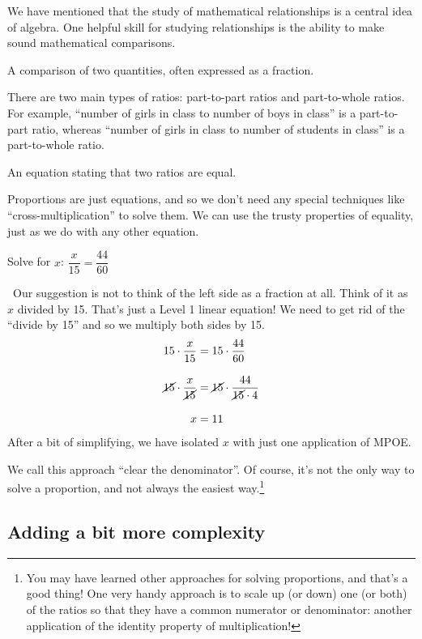 We have mentioned that the study of mathematical relationships is a central idea of algebra. One helpful skill for studying relationships is the ability to make sound mathematical comparisons.

\begin{boxeddef}[Ratio]
A comparison of two quantities, often expressed as a fraction.
\end{boxeddef}

There are two main types of ratios: part-to-part ratios and part-to-whole ratios. For example, ``number of girls in class to number of boys in class'' is a part-to-part ratio, whereas ``number of girls in class to number of students in class'' is a part-to-whole ratio.

\begin{boxeddef}[Proportion]
An equation stating that two ratios are equal.
\end{boxeddef}

Proportions are just equations, and so we don't need any special techniques like ``cross-multiplication'' to solve them. We can use the trusty properties of equality, just as we do with any other equation.

\begin{boxedex}
Solve for $x$: $\dfrac{x}{15}=\dfrac{44}{60}$

\exsoln\ Our suggestion is not to think of the left side as a fraction at all. Think of it as $x$ divided by 15. That's just a Level 1 linear equation! We need to get rid of the ``divide by 15'' and so we multiply both sides by 15.
\[\begin{aligned}
15\cdot\frac{x}{15} &= 15\cdot\frac{44}{60}\\[2ex]
\cancel{15}\cdot\frac{x}{\cancel{15}} &= \cancel{15}\cdot\frac{44}{\cancel{15}\cdot4}\\[2ex]
x&=11
\end{aligned}\]
After a bit of simplifying, we have isolated $x$ with just one application of MPOE.
\end{boxedex}

We call this approach ``clear the denominator''. Of course, it's not the only way to solve a proportion, and not always the easiest way.\footnote{You may have learned other approaches for solving proportions, and that's a good thing! One very handy approach is to scale up (or down) one (or both) of the ratios so that they have a common numerator or denominator: another application of the identity property of multiplication!}

\subsection{Adding a bit more complexity}

